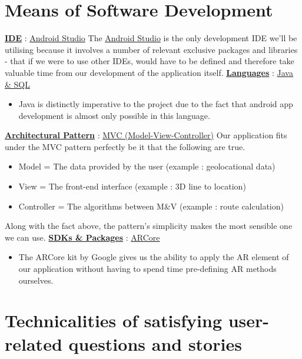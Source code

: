 
\section*{Means of Software Development}    
\underline{\textbf{IDE}} : \underline{Android Studio}
\newline
The \underline{Android Studio} is the only development IDE we'll be utilising because it involves a number of relevant exclusive packages and libraries - that if we were to use other IDEs, would have to be defined and therefore take valuable time from our development of the application itself.
\newline
\newline
\underline{\textbf{Languages}} : \underline{Java \& SQL}
\begin{itemize}
    \item Java is distinctly imperative to the project due to the fact that android app development is almost only possible in this language.
\end{itemize}
\underline{\textbf{Architectural Pattern}} : \underline{MVC (Model-View-Controller)}
\newline
\newline
Our application fits under the MVC pattern perfectly be it that the following are true.
\begin{itemize}
    \item Model = The data provided by the user (example : geolocational data)
    \item View = The front-end interface (example : 3D line to location)
    \item Controller = The algorithms between M\&V (example : route calculation)
\end{itemize}
Along with the fact above, the pattern's simplicity makes the most sensible one we can use.
\newline
\newline
\underline{\textbf{SDKs \& Packages}} : \underline{ARCore}
\begin{itemize}
    \item The ARCore kit by Google gives us the ability to apply the AR element of our application without having to spend time pre-defining AR methods ourselves.
\end{itemize}
\newpage
\section*{Technicalities of satisfying user-related questions and stories}
